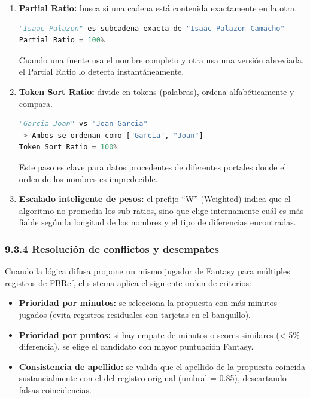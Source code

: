 \begin{enumerate}
\item \textbf{Partial Ratio:} busca si una cadena está contenida exactamente en la otra.
\begin{lstlisting}[language=Python,caption={Partial Ratio: búsqueda de subcadenas}]
"Isaac Palazon" es subcadena exacta de "Isaac Palazon Camacho"
Partial Ratio = 100%
\end{lstlisting}
Cuando una fuente usa el nombre completo y otra usa una versión abreviada, el Partial Ratio lo detecta instantáneamente.
 
\item \textbf{Token Sort Ratio:} divide en tokens (palabras), ordena alfabéticamente y compara.
\begin{lstlisting}[language=Python,caption={Token Sort Ratio: ordenación de tokens}]
"Garcia Joan" vs "Joan Garcia"
-> Ambos se ordenan como ["Garcia", "Joan"]
Token Sort Ratio = 100%
\end{lstlisting}
Este paso es clave para datos procedentes de diferentes portales donde el orden de los nombres es impredecible.
 
\item \textbf{Escalado inteligente de pesos:} el prefijo ``W'' (Weighted) indica que el algoritmo no promedia los sub-ratios, sino que
elige internamente cuál es más fiable según la longitud de los nombres y el tipo de diferencias encontradas.
\end{enumerate}
 
\subsubsection{9.3.4 Resolución de conflictos y desempates}
 
Cuando la lógica difusa propone un mismo jugador de Fantasy para múltiples registros de FBRef, el sistema aplica el siguiente orden de criterios:
 
\begin{itemize}
\item \textbf{Prioridad por minutos:} se selecciona la propuesta con más minutos jugados (evita registros residuales con tarjetas en el banquillo).
 
\item \textbf{Prioridad por puntos:} si hay empate de minutos o scores similares (< 5\% diferencia), se elige el candidato con mayor puntuación Fantasy.
 
\item \textbf{Consistencia de apellido:} se valida que el apellido de la propuesta coincida sustancialmente con el del registro original (umbral = 0.85), descartando falsas coincidencias.
\end{itemize}
 
